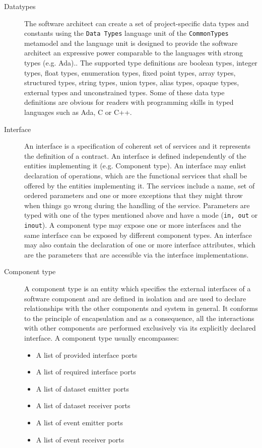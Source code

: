 \begin{description}
\item [Datatypes] The software architect can create a set of project-specific data types and constants using the \texttt{Data Types} language unit of the \texttt{CommonTypes} metamodel and the language unit is designed to provide the software architect an expressive power comparable to the languages with strong types (e.g. Ada).\cite{SpecMetamodel}. The supported type definitions are boolean types, integer types, float types, enumeration types, fixed point types, array types, structured types, string types, union types, alias types, opaque types, external types and unconstrained types. Some of these data type definitions are obvious for readers with programming skills in typed languages such as Ada, C or C++. 

\item [Interface] An interface is a specification of coherent set of services and it represents the definition of a contract. An interface is defined independently of the entities implementing it (e.g. Component type). An interface may enlist declaration of operations, which are the functional services that shall be offered by the entities implementing it. The services include a name, set of ordered parameters and one or more exceptions that they might throw when things go wrong during the handling of the service. Parameters are typed with one of the types mentioned above and have a mode (\texttt{in, out} or \texttt{inout}). A component type may expose one or more interfaces and the same interface can be exposed by different component types. An interface may also contain the declaration of one or more interface attributes, which are the parameters that are accessible via the interface implementations.

\item [Component type] A component type is an entity which specifies the external interfaces of a software component and are defined in isolation and are used to declare relationships with the other components and system in general. It conforms to the principle of encapsulation and as a consequence, all the interactions with other components are performed exclusively via its explicitly declared interface. A component type usually encompasses:
\begin{itemize}
\item A list of provided interface ports
\item A list of required interface ports
\item A list of dataset emitter ports 
\item A list of dataset receiver ports
\item A list of event emitter ports
\item A list of event receiver ports 
\end{itemize}


\end{description}
